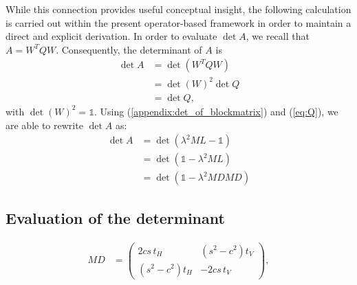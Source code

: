 \documentclass[%
 reprint,
 amsmath,amssymb,
 aps,
twocolumn
]{revtex4-2}
\begin{document}
While this connection provides useful conceptual insight, the following calculation is carried out within the present operator-based framework in order to maintain a direct and explicit derivation. In order to evaluate $\det A$, we recall that $A=W^TQW$. Consequently, the determinant of $A$ is
\begin{align}
\det A &= \det(W^TQW)\\
&=\det (W)^2\det Q\\
&=\det Q,
\end{align}
with $\det(W)^2=\mathbb 1$. Using (\ref{appendix:det_of_blockmatrix}) and (\ref{eq:Q}), we are able to rewrite $\det A$ as:
\begin{align}
\det A&=\det(\lambda^2ML-\mathbb{1})\\
&=\det(\mathbb{1}-\lambda^2ML)\\
&=\det(\mathbb{1}-\lambda^2MDMD)
\end{align}
\subsection{Evaluation of the determinant}
\begin{align}
MD&=
\begin{pmatrix}
2cs\,t_H & (s^2-c^2)t_V\\
(s^2-c^2)t_H & -2cs\,t_V
\end{pmatrix},
\end{align}
\end{document}
